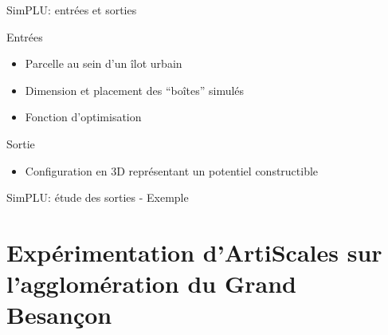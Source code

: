 \documentclass[xcolor=table]{beamer}
\newcommand\FontPetit{\fontsize{8}{6}\selectfont}
\begin{document}
\begin{frame}{SimPLU: entrées et sorties}
	\begin{block}{Entrées}
		\begin{itemize}
			\item Parcelle au sein d'un îlot urbain
			\item Dimension et placement des ``boîtes'' simulés
			\item Fonction d'optimisation
		\end{itemize}
	\end{block}
	\begin{block}{Sortie}
		\begin{itemize}
			\item Configuration en 3D représentant un potentiel constructible
		\end{itemize}
	\end{block}
	\begin{block}
	\end{block}		
\end{frame}

\begin{frame}{SimPLU: étude des sorties - Exemple}
	\\
	\FontPetit{}
\end{frame}





\section[Expérimentation]{Expérimentation d'ArtiScales sur l'agglomération du Grand Besançon}
\end{document}
